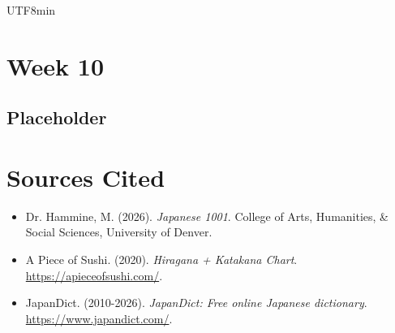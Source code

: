 \documentclass[11pt]{article}
\begin{document}
\begin{CJK}{UTF8}{min}
\newpage
\section{Week 10}

\subsection{Placeholder}


\newpage
\section{Sources Cited}

\begin{itemize}
    \item Dr. Hammine, M. (2026).  \emph{Japanese 1001}. College of Arts, Humanities, \& Social Sciences, University of Denver.
    \item A Piece of Sushi. (2020). \emph{Hiragana + Katakana Chart}. \url{https://apieceofsushi.com/}.
    \item JapanDict. (2010-2026). \emph{JapanDict: Free online Japanese dictionary}. \url{https://www.japandict.com/}.
\end{itemize}


\end{CJK}
\end{document}
